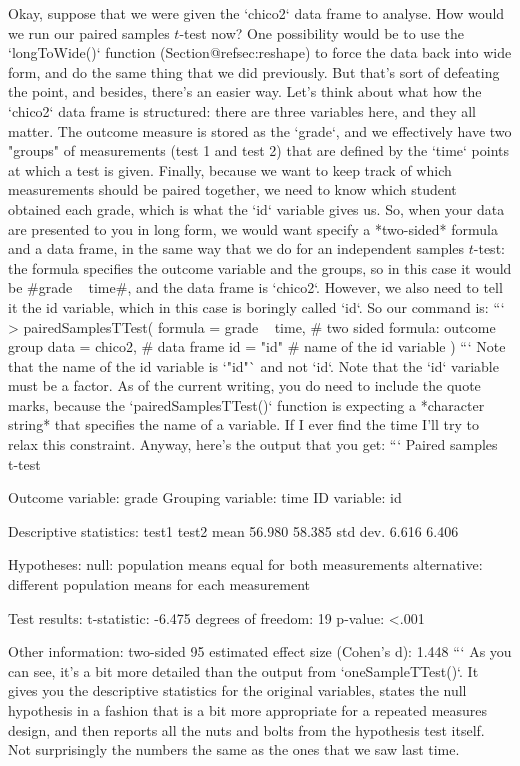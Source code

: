 Okay, suppose that we were given the `chico2` data frame to analyse. How would we run our paired samples $t$-test now? One possibility would be to use the `longToWide()` function (Section@refsec:reshape) to force the data back into wide form, and do the same thing that we did previously. But that's sort of defeating the point, and besides, there's an easier way. Let's think about what how the `chico2` data frame is structured: there are three variables here, and they all matter. The outcome measure is stored as the `grade`, and we effectively have two "groups" of measurements (test 1 and test 2) that are defined by the `time` points at which a test is given. Finally, because we want to keep track of which measurements should be paired together, we need to know which student obtained each grade, which is what the `id` variable gives us. So, when your data are presented to you in long form, we would want specify a *two-sided* formula and a data frame, in the same way that we do for an independent samples $t$-test: the formula specifies the outcome variable and the groups, so in this case it would be \rtextverb#grade ~ time#, and the data frame is `chico2`. However, we also need to tell it the id variable, which in this case is boringly called `id`. So our command is:
```
> pairedSamplesTTest( 
     formula = grade ~ time,  # two sided formula: outcome ~ group
     data = chico2,           # data frame
     id = "id"                # name of the id variable
  )
```
Note that the name of the id variable is `"id"` and not `id`. Note that the `id` variable must be a factor. As of the current writing, you do need to include the quote marks, because the `pairedSamplesTTest()` function is expecting a *character string* that specifies the name of a variable. If I ever find the time I'll try to relax this constraint. Anyway, here's the output that you get:
```
   Paired samples t-test 

Outcome variable:   grade 
Grouping variable:  time 
ID variable:        id 

Descriptive statistics: 
             test1  test2
   mean     56.980 58.385
   std dev.  6.616  6.406

Hypotheses: 
   null:        population means equal for both measurements
   alternative: different population means for each measurement

Test results: 
   t-statistic:  -6.475 
   degrees of freedom:  19 
   p-value:  <.001 

Other information: 
   two-sided 95%
   estimated effect size (Cohen's d):  1.448 
```
As you can see, it's a bit more detailed than the output from `oneSampleTTest()`. It gives you the descriptive statistics for the original variables, states the null hypothesis in a fashion that is a bit more appropriate for a repeated measures design, and then reports all the nuts and bolts from the hypothesis test itself. Not surprisingly the numbers the same as the ones that we saw last time.

